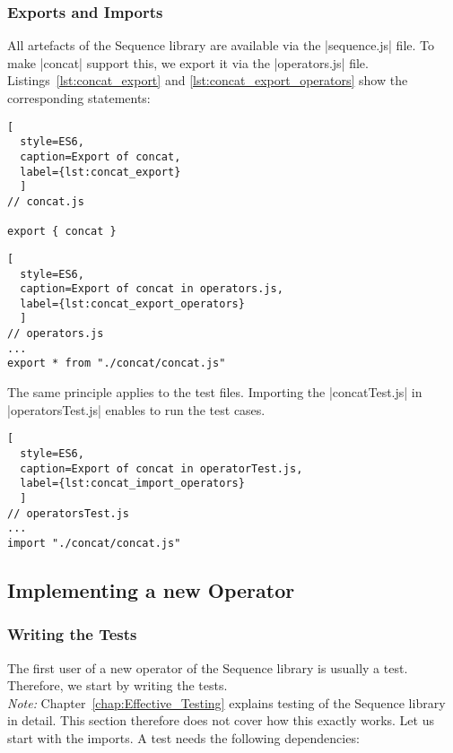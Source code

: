 \subsubsection{Exports and Imports}
\label{subsub:Exports and Imports}
All artefacts of the Sequence library are available via the |sequence.js| file.
To make |concat| support this, we export it via the |operators.js| file.
Listings~\ref{lst:concat_export} and \ref{lst:concat_export_operators} show the
corresponding statements:

\begin{lstlisting}[
  style=ES6, 
  caption=Export of concat,
  label={lst:concat_export}
  ]
// concat.js

export { concat }
\end{lstlisting}



\begin{lstlisting}[
  style=ES6, 
  caption=Export of concat in operators.js,
  label={lst:concat_export_operators}
  ]
// operators.js
...
export * from "./concat/concat.js"
\end{lstlisting}

The same principle applies to the test files. Importing the |concatTest.js| in
|operatorsTest.js| enables to run the test cases.

\begin{lstlisting}[
  style=ES6, 
  caption=Export of concat in operatorTest.js,
  label={lst:concat_import_operators}
  ]
// operatorsTest.js
...
import "./concat/concat.js"
\end{lstlisting}

\subsection{Implementing a new Operator}
\label{subsub:Implementing a new Operator}

\subsubsection{Writing the Tests}
\label{subsub:Write the Tests}
The first user of a new operator of the Sequence library is usually a test.
Therefore, we start by writing the tests.\\
\textit{Note:} Chapter~\ref{chap:Effective_Testing} explains testing of the
Sequence library in detail. This section therefore does not cover how this
exactly works.
\newline
Let us start with the imports. A test needs the following dependencies:

